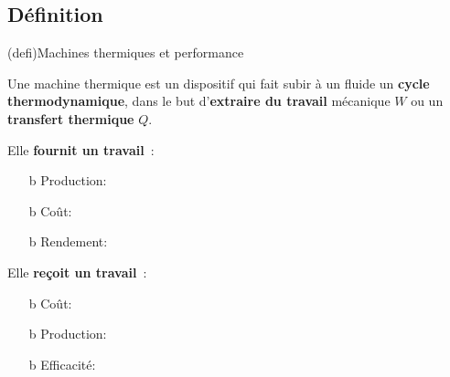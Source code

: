 \documentclass[../../main/main.tex]{subfiles}
\begin{document}
\subsection{Définition}

\begin{tcb*}(defi){Machines thermiques et performance}
	\begin{isd}[righthand ratio=.25]
		Une machine thermique est un dispositif qui fait subir à un fluide un
		\textbf{cycle thermodynamique}, dans le but d'\textbf{extraire du travail}
		mécanique $W$ ou un \textbf{transfert thermique} $Q$.
		\tcblower
		\vspace{-15pt}
		\psw{%
			\[
				\text{COP} = \abs{\frac{\text{production}}{\text{coût}}}
			\]
		}%
		\vspace{-15pt}
	\end{isd}
	\begin{isd}[sidebyside align=top]
		Elle \textbf{fournit un travail}~:
		\begin{itemize}
			\item[b]{Production}: 
			\item[b]{Coût}: 
			\item[b]{Rendement}: 
		\end{itemize}
		\vspace{-15pt}
		\tcblower
		Elle \textbf{reçoit un travail}~:
		\begin{itemize}
			\item[b]{Coût}: 
			\item[b]{Production}: 
			\item[b]{Efficacité}: 
		\end{itemize}
		\vspace{-15pt}
	\end{isd}
\end{tcb*}
\vspace{-15pt}
\end{document}
